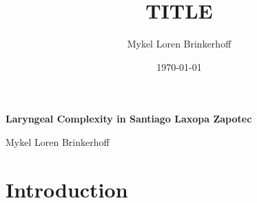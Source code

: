\documentclass[12pt, letterpaper]{article}
\title{TITLE}
\author{Mykel Loren Brinkerhoff}
\date{\today}
\begin{document}


\begin{center}
    {\Large \textbf{Laryngeal Complexity in Santiago Laxopa Zapotec}}
	
    \vspace{6pt}

    Mykel Loren Brinkerhoff
\end{center}
\thispagestyle{fancy}


\section{Introduction} \label{sec:Introduction}
\end{document}
